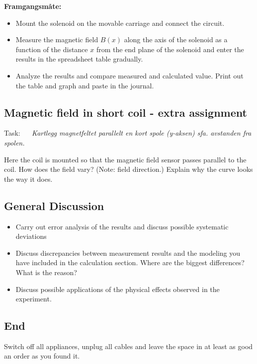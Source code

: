 \documentclass[../Elmag-labhefte-2020.tex]{subfiles}
\begin{document}
\textbf{Framgangsmåte:}
\vspace{-5mm}
\begin{itemize}
    \item Mount the solenoid on the movable carriage and connect the circuit.
    \item Measure the magnetic field $B(x)$ along the axis of the solenoid as a function of the distance $x$ from the end plane of the solenoid and enter the results in the spreadsheet table gradually.
    \item Analyze the results and compare measured and calculated value. Print out the table and graph and paste in the journal.
\end{itemize}

\subsection{Magnetic field in short coil - extra assignment}

Task: \ \
\emph{ Kartlegg magnetfeltet parallelt en kort spole (y-aksen) sfa. avstanden fra spolen.}
 

Here the coil is mounted so that the magnetic field sensor passes parallel to the coil. How does the field vary? (Note: field direction.) Explain why the curve looks the way it does.

\subsection{General Discussion}

\begin{itemize}
   \item Carry out error analysis of the results and discuss possible systematic deviations
   \item Discuss discrepancies between measurement results and the modeling you have included in the calculation section. Where are the biggest differences? What is the reason?
    \item Discuss possible applications of the physical effects observed in the experiment.
\end{itemize}

\subsection{End}

Switch off all appliances, unplug all cables and leave the space in at least as good an order as you found it.
\end{document}
